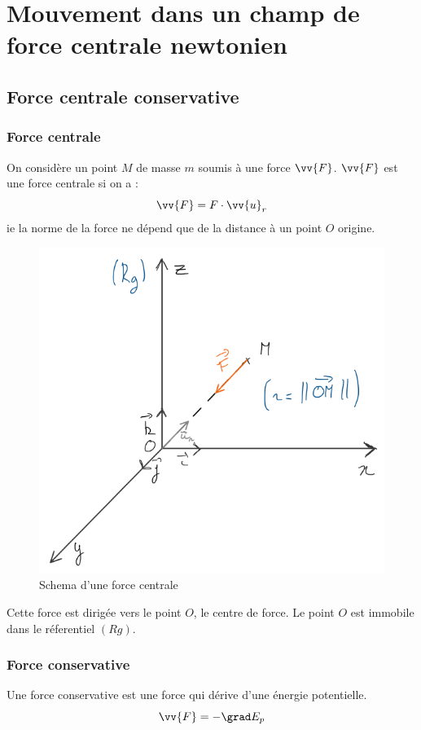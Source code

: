 \graphicspath{{C:/Users/Maxime Muller/Documents/Latex/Phytheme/Complement-cinematique/Figures}}
\chapter{Mouvement dans un champ de force centrale newtonien}
\section{Force centrale conservative}
\subsection{Force centrale}
\begin{definition}
    On considère un point \(M\) de masse \(m\) soumis à une force \(\vv{F}\). \(\vv{F}\) est une force centrale si on a : 
    \[
        \vv{F} = F \cdot \vv{u}_{r}
    \]  
    ie la norme de la force ne dépend que de la distance à un point \(O\) origine.
\end{definition}

\begin{figure}[!htb]
    \centering
    \includegraphics[width=0.4 \textwidth]{SCHEMA3-1.png}
    \caption{Schema d'une force centrale}
    \label{fig:SCHEMA3-1}
\end{figure}

\begin{eg}[Exemple]
    Cette force est dirigée vers le point \(O\), le centre de force. Le point \(O\) est immobile dans le réferentiel \((Rg)\). 
\end{eg}



\subsection{Force conservative}
\begin{definition}
    Une force conservative est une force qui dérive d'une énergie potentielle.
    \[
        \vv{F} = -\grad E_{p}
    \]
\end{definition}

